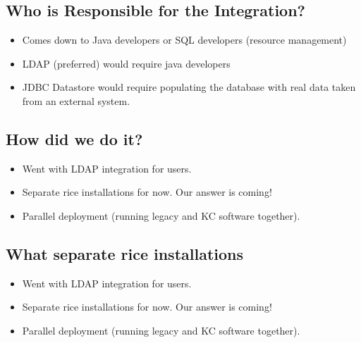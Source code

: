 \documentclass[12pt,notitlepage]{article}
\begin{document}
\begin{s5presentation}
%
%
  \W \begin{s5slide}
    \section{Who is Responsible for the Integration?}
    \begin{itemize}
      \item Comes down to Java developers or SQL developers (resource management)
      \item LDAP (preferred) would require java developers
      \item JDBC Datastore would require populating the database with
        real data taken from an external system.
    \end{itemize}
  \W \end{s5slide}

%
%
  \W \begin{s5slide}
    \section{How did we do it?}
    \begin{itemize}
      \item Went with LDAP integration for users.
      \item Separate rice installations for now. Our answer is coming!
      \item Parallel deployment (running legacy and KC software together).
    \end{itemize}
  \W \end{s5slide}

%
%
  \W \begin{s5slide}
    \section{What separate rice installations}
    \begin{itemize}
      \item Went with LDAP integration for users.
      \item Separate rice installations for now. Our answer is coming!
      \item Parallel deployment (running legacy and KC software together).
    \end{itemize}
  \W \end{s5slide}


\end{s5presentation}
\end{document}
